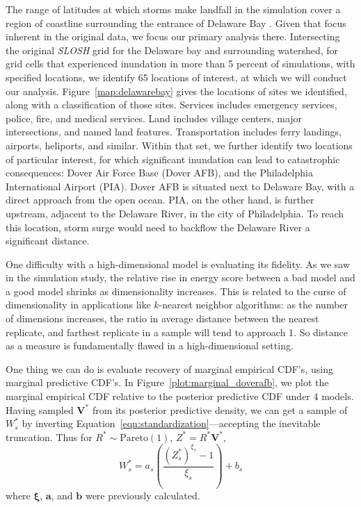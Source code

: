The range of latitudes at which storms make landfall in the simulation cover a region of
    coastline surrounding the entrance of Delaware Bay .  Given that focus inherent in the original data, we focus our primary analysis there.
    Intersecting the original \emph{SLOSH} grid for the Delaware bay and surrounding watershed, 
    for grid cells that experienced inundation in more than 5 percent of simulations, 
    with specified locations, we identify 65 locations of interest, at which we will conduct 
    our analysis.  Figure~\ref{map:delawarebay} gives the locations of sites we identified, along
    with a classification of those sites.  Services includes emergency services, police, fire,
    and medical services.  Land includes village centers, major intersections, and named
    land features.  Transportation includes ferry landings, airports, heliports, and similar.
    Within that set, we further identify two locations of particular interest, 
    for which significant inundation can lead to catastrophic consequences:  
    Dover Air Force Base (Dover AFB), and the Philadelphia International 
    Airport (PIA). Dover AFB is situated next to Delaware Bay, with a direct approach from the
    open ocean.  PIA, on the other hand, is further upstream, adjacent to the Delaware River, 
    in the city of Philadelphia.  To reach this location, storm surge would need to backflow 
    the Delaware River a significant distance.

One difficulty with a high-dimensional model is evaluating its fidelity.  As we saw in the simulation
    study, the relative rise in energy score between a bad model and a good model shrinks as
    dimensionality increases.  This is related to the curse of dimensionality in applications like
    $k$-nearest neighbor algorithms: as the number of dimensions increases, the ratio in average
    distance between the nearest replicate, and farthest replicate in a sample will tend to approach 1.
    So distance as a measure is fundamentally flawed in a high-dimensional setting.

One thing we can do is evaluate recovery of marginal empirical CDF's, using marginal
    predictive CDF's.  In Figure~\ref{plot:marginal_doverafb}, we plot the marginal
    empirical CDF relative to the posterior predictive CDF under \num{4} models.  
    Having sampled $\bm{V}^{*}$ from its posterior predictive density, we can get a sample of $W_s^*$
    by inverting Equation~\eqref{eqn:standardization}---accepting the inevitable truncation.  Thus
    for $R^*\sim\text{Pareto}(1)$, $Z^* = R^*\bm{V}^*$,
    \begin{equation*}
        W_s^* = a_s\left(\frac{(Z_s^*)^{\xi_s} - 1}{\xi_s}\right) + b_s
    \end{equation*}
    where $\bm{\xi}$, $\bm{a}$, and $\bm{b}$ were previously calculated.  

